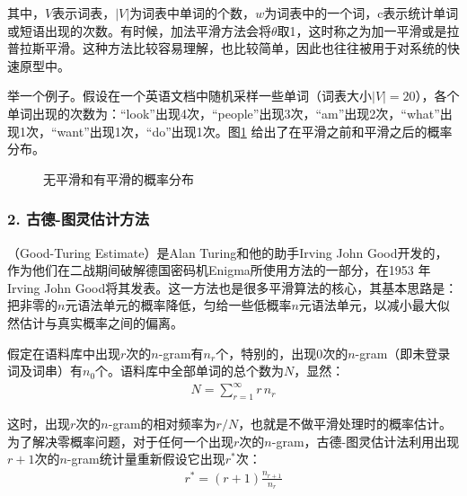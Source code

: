 \noindent 其中，$V$表示词表，$|V|$为词表中单词的个数，$w$为词表中的一个词，c表示统计单词或短语出现的次数。有时候，加法平滑方法会将$\theta$取1，这时称之为加一平滑或是拉普拉斯平滑。这种方法比较容易理解，也比较简单，因此也往往被用于对系统的快速原型中。

\parinterval 举一个例子。假设在一个英语文档中随机采样一些单词（词表大小$|V|=20$），各个单词出现的次数为：“look”出现4次，“people”出现3次，“am”出现2次，“what”出现1次，“want”出现1次，“do”出现1次。图\ref{fig:2-12} 给出了在平滑之前和平滑之后的概率分布。

\begin{figure}[htp]
    \centering
 	
	\caption{无平滑和有平滑的概率分布}
    \label{fig:2-12}
\end{figure}


\subsubsection{2. 古德-图灵估计方法}

\vspace{-0.5em}
（Good-Turing Estimate）是Alan Turing和他的助手Irving John Good开发的，作为他们在二战期间破解德国密码机Enigma所使用方法的一部分，在1953 年Irving John Good将其发表。这一方法也是很多平滑算法的核心，其基本思路是：把非零的$n$元语法单元的概率降低，匀给一些低概率$n$元语法单元，以减小最大似然估计与真实概率之间的偏离。

\parinterval 假定在语料库中出现$r$次的$n$-gram有$n_r$个，特别的，出现0次的$n$-gram（即未登录词及词串）有$n_0$个。语料库中全部单词的总个数为$N$，显然：
\begin{eqnarray}
N = \sum_{r=1}^{\infty}{r\,n_r}
\label{eq:2-28}
\end{eqnarray}

\parinterval 这时，出现$r$次的$n$-gram的相对频率为$r/N$，也就是不做平滑处理时的概率估计。为了解决零概率问题，对于任何一个出现$r$次的$n$-gram，古德-图灵估计法利用出现$r+1$次的$n$-gram统计量重新假设它出现$r^*$次：
\begin{eqnarray}
r^* = (r + 1)\frac{n_{r + 1}}{n_r}
\label{eq:2-29}
\end{eqnarray}

